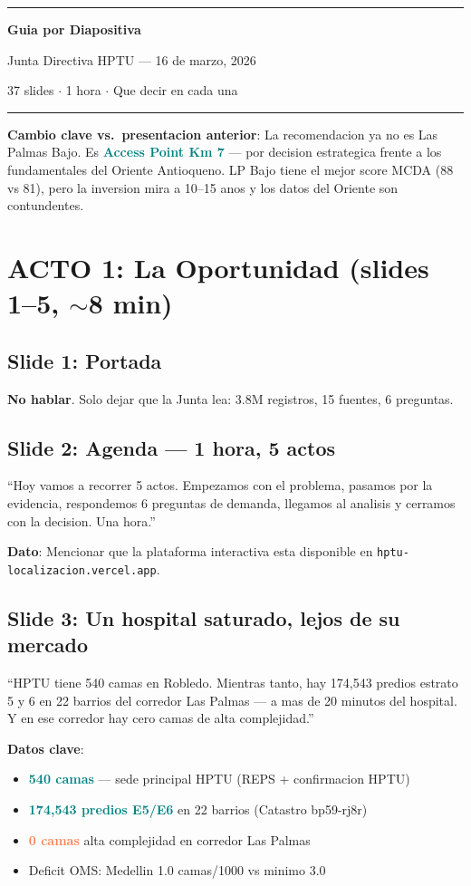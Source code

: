 \documentclass[10pt, a4paper]{article}
\newcommand{\hl}[1]{\textcolor{teal}{\textbf{#1}}}
\newcommand{\dg}[1]{\textcolor{coral}{\textbf{#1}}}
\newcommand{\slide}[2]{\subsection{Slide #1: #2}}
\begin{document}
\begin{center}
{\color{hptu}\rule{\textwidth}{2pt}}
\vspace{8pt}
{\LARGE\bfseries\color{hptu} Guia por Diapositiva}
\vspace{4pt}

{\Large Junta Directiva HPTU --- 16 de marzo, 2026}
\vspace{4pt}

{\normalsize\color{slate} 37 slides $\cdot$ 1 hora $\cdot$ Que decir en cada una}
\vspace{8pt}
{\color{hptu}\rule{\textwidth}{2pt}}
\end{center}

\vspace{6pt}

\begin{alerta}
\textbf{Cambio clave vs.\ presentacion anterior}: La recomendacion ya no es Las Palmas Bajo. Es \hl{Access Point Km 7} --- por decision estrategica frente a los fundamentales del Oriente Antioqueno. LP Bajo tiene el mejor score MCDA (88 vs 81), pero la inversion mira a 10--15 anos y los datos del Oriente son contundentes.
\end{alerta}

\section{ACTO 1: La Oportunidad (slides 1--5, $\sim$8 min)}

\slide{1}{Portada}
\textbf{No hablar}. Solo dejar que la Junta lea: 3.8M registros, 15 fuentes, 6 preguntas.

\slide{2}{Agenda --- 1 hora, 5 actos}
\begin{tip}
``Hoy vamos a recorrer 5 actos. Empezamos con el problema, pasamos por la evidencia, respondemos 6 preguntas de demanda, llegamos al analisis y cerramos con la decision. Una hora.''
\end{tip}
\textbf{Dato}: Mencionar que la plataforma interactiva esta disponible en \texttt{hptu-localizacion.vercel.app}.

\slide{3}{Un hospital saturado, lejos de su mercado}
\begin{tip}
``HPTU tiene 540 camas en Robledo. Mientras tanto, hay 174,543 predios estrato 5 y 6 en 22 barrios del corredor Las Palmas --- a mas de 20 minutos del hospital. Y en ese corredor hay cero camas de alta complejidad.''
\end{tip}
\textbf{Datos clave}:
\begin{itemize}[nosep]
  \item \hl{540 camas} --- sede principal HPTU (REPS + confirmacion HPTU)
  \item \hl{174,543 predios E5/E6} en 22 barrios (Catastro bp59-rj8r)
  \item \dg{0 camas} alta complejidad en corredor Las Palmas
  \item Deficit OMS: Medellin 1.0 camas/1000 vs minimo 3.0
\end{itemize}
\end{document}
